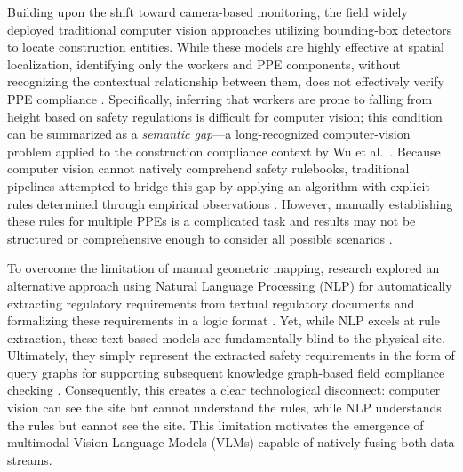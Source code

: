 \documentclass[10pt,letterpaper]{article}
\begin{document}
Building upon the shift toward camera-based monitoring, the field widely deployed traditional computer vision approaches utilizing bounding-box detectors to locate construction entities. While these models are highly effective at spatial localization, identifying only the workers and PPE components, without recognizing the contextual relationship between them, does not effectively verify PPE compliance \cite{nath2020}. Specifically, inferring that workers are prone to falling from height based on safety regulations is difficult for computer vision; this condition can be summarized as a \textit{semantic gap}---a long-recognized computer-vision problem applied to the construction compliance context by Wu et al.\ \cite{wu2021}. Because computer vision cannot natively comprehend safety rulebooks, traditional pipelines attempted to bridge this gap by applying an algorithm with explicit rules determined through empirical observations \cite{nath2020}. However, manually establishing these rules for multiple PPEs is a complicated task and results may not be structured or comprehensive enough to consider all possible scenarios \cite{nath2020}.

To overcome the limitation of manual geometric mapping, research explored an alternative approach using Natural Language Processing (NLP) for automatically extracting regulatory requirements from textual regulatory documents and formalizing these requirements in a logic format \cite{zhang2015}. Yet, while NLP excels at rule extraction, these text-based models are fundamentally blind to the physical site. Ultimately, they simply represent the extracted safety requirements in the form of query graphs for supporting subsequent knowledge graph-based field compliance checking \cite{wang2023}. Consequently, this creates a clear technological disconnect: computer vision can see the site but cannot understand the rules, while NLP understands the rules but cannot see the site. This limitation motivates the emergence of multimodal Vision-Language Models (VLMs) capable of natively fusing both data streams.
\end{document}
